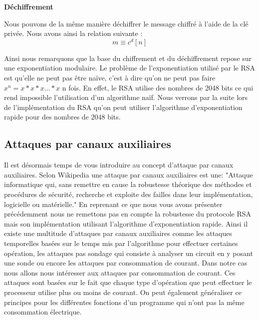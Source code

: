 \textbf{Déchiffrement}


Nous pouvons de la même manière déchiffrer le message chiffré à l'aide de la clé privée. 
Nous avons ainsi la relation suivante :
\begin{equation}
\label{eq:dechiffrement}
m \equiv c^d [n]
\end{equation}


Ainsi nous remarquons que la base du chiffrement et du déchiffrement repose sur une exponentiation modulaire. Le problème de l'exponentiation utilisé par le RSA est qu'elle ne peut pas être naïve, c'est à dire qu'on ne peut pas faire $ x^n = x*x*x...*x$ n fois. En effet, le RSA utilise des nombres de 2048 bits ce qui rend impossible l'utilisation d'un algorithme naïf.
Nous verrons par la suite lors de l'implémentation du RSA qu'on peut utiliser l'algorithme d'exponentiation rapide pour des nombres de 2048 bits.
\subsection{Attaques par canaux auxiliaires}
Il est désormais temps de vous introduire au concept d'attaque par canaux auxiliaires.
Selon Wikipedia une attaque par canaux auxiliaires est une:
"Attaque informatique qui, sans remettre en cause la robustesse théorique des méthodes et procédures de sécurité, recherche et exploite des failles dans leur implémentation, logicielle ou matérielle."
En reprenant ce que nous vous avons présenter précédemment nous ne remettons pas en compte la robustesse du protocole RSA mais son implémentation utilisant l'algorithme d’exponentiation rapide.
Ainsi il existe une multitude d'attaques par canaux auxiliaires comme les attaques temporelles basées sur le temps mis par l'algorithme pour effectuer certaines opération, les attaques pas sondage qui consiste à analyser un circuit en y posant une sonde ou encore les attaques par consommation de courant.
Dans notre cas nous allons nous intéresser aux attaques par consommation de courant. Ces attaques sont basées sur le fait que chaque type d'opération que peut effectuer le processeur utilise plus ou moins de courant. On peut également généraliser ce principes pour les différentes fonctions d'un programme qui n'ont pas la même consommation électrique.
\newpage
